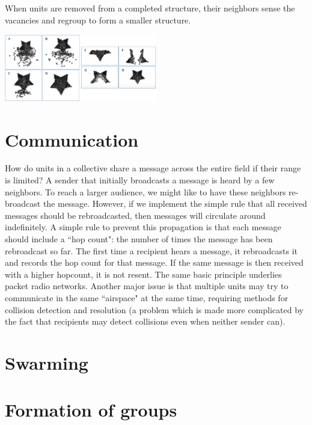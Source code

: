 \documentclass{article}
\begin{document}
When units are removed from a completed structure, their neighbors sense the vacancies and regroup to form a smaller structure.

\begin{center}
\includegraphics[width=0.5\textwidth]{sdash_healing.pdf}
\end{center}

\section*{Communication}

How do units in a collective share a message across the entire field if their range is limited? A sender that initially broadcasts a message is heard by a few neighbors. To reach a larger audience, we might like to have these neighbors re-broadcast the message. However, if we implement the simple rule that all received messages should be rebroadcasted, then messages will circulate around indefinitely. A simple rule to prevent this propagation is that each message should include a ``hop count": the number of times the message has been rebroadcast so far. The first time a recipient hears a message, it rebroadcasts it and records the hop count for that message. If the same message is then received with a higher hopcount, it is not resent. The same basic principle underlies packet radio networks. Another major issue is that multiple units may try to communicate in the same ``airspace" at the same time, requiring methods for collision detection and resolution (a problem which is made more complicated by the fact that recipients may detect collisions even when neither sender can).

\section*{Swarming}

\section*{Formation of groups}
\end{document}

